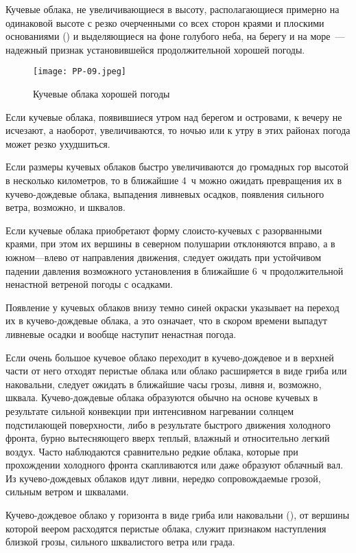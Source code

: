  Кучевые облака, не увеличивающиеся в высоту, располагающиеся
примерно на одинаковой высоте с резко очерченными со всех сторон
краями и плоскими основаниями () и выделяющиеся на фоне
голубого неба, на берегу и на море~--- надежный признак установившейся
продолжительной хорошей погоды.

\begin{figure}[htb]
  \centering{}
  \texttt{[image: PP-09.jpeg]}
  \caption{Кучевые облака хорошей погоды}
  \label{fig:pp09}
  \small
  \centering{}
\end{figure}

 Если кучевые облака, появившиеся утром над берегом и островами,
к вечеру не исчезают, а наоборот, увеличиваются, то ночью или к утру в
этих районах погода может резко ухудшиться.

 Если размеры кучевых облаков быстро увеличиваются до громадных
гор высотой в несколько километров, то в ближайшие 4~ч можно ожидать
превращения их в кучево-дождевые облака, выпадения ливневых осадков,
появления сильного ветра, возможно, и шквалов.

 Если кучевые облака приобретают форму слоисто-кучевых с
разорванными краями, при этом их вершины в северном полушарии
отклоняются вправо, а в южном—влево от направления движения, следует
ожидать при устойчивом падении давления возможного установления в
ближайшие 6~ч продолжительной ненастной ветреной погоды с
осадками.

 Появление у кучевых облаков внизу темно синей окраски указывает
на переход их в кучево-дождевые облака, а это означает, что в скором
времени выпадут ливневые осадки и вообще наступит ненастная погода.

 Если очень большое кучевое облако переходит в кучево-дождевое и
в верхней части от него отходят перистые облака или облако расширяется
в виде гриба или наковальни, следует ожидать в ближайшие часы грозы,
ливня и, возможно, шквала. Кучево-дождевые облака образуются обычно на
основе кучевых в результате сильной конвекции при интенсивном
нагревании солнцем подстилающей поверхности, либо в результате
быстрого движения холодного фронта, бурно вытесняющего вверх теплый,
влажный и относительно легкий воздух. Часто наблюдаются сравнительно
редкие облака, которые при прохождении холодного фронта скапливаются
или даже образуют облачный вал. Из кучево-дождевых облаков идут ливни,
нередко сопровождаемые грозой, сильным ветром и шквалами.

 Кучево-дождевое облако у горизонта в виде гриба или наковальни
(), от вершины которой веером расходятся перистые облака,
служит признаком наступления близкой грозы, сильного шквалистого ветра
или града.

